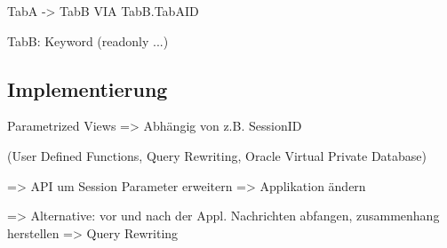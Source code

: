 TabA -> TabB VIA TabB.TabAID 

TabB: Keyword (readonly ...)


\subsection*{Implementierung}

Parametrized Views => Abhängig von z.B. SessionID

(User Defined Functions, Query Rewriting, Oracle Virtual Private Database)

=> API um Session Parameter erweitern => Applikation ändern

=> Alternative: vor und nach der Appl. Nachrichten abfangen, zusammenhang herstellen => Query Rewriting

